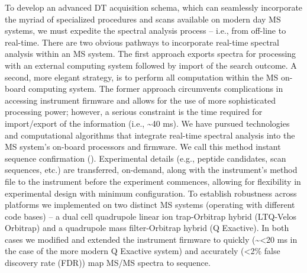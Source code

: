 To develop an advanced DT acquisition schema, which can seamlessly incorporate the myriad of specialized procedures and scans available on modern day MS systems, we must expedite the spectral analysis process -- i.e., from off-line to real-time. There are two obvious pathways to incorporate real-time spectral analysis within an MS system. The first approach exports spectra for processing with an external computing system followed by import of the search outcome.\cite{mqrt} A second, more elegant strategy, is to perform all computation within the MS on-board computing system.\cite{transform} The former approach circumvents complications in accessing instrument firmware and allows for the use of more sophisticated processing power; however, a serious constraint is the time required for import/export of the information (i.e., \textasciitilde40 ms). We have pursued technologies and computational algorithms that integrate real-time spectral analysis into the MS system's on-board processors and firmware. We call this method instant sequence confirmation (\inseq{}). Experimental details (e.g., peptide candidates, scan sequences, etc.) are transferred, on-demand, along with the instrument's method file to the instrument before the experiment commences, allowing for flexibility in experimental design with minimum configuration. To establish robustness across platforms we implemented \inseq{} on two distinct MS systems (operating with different code bases) -- a dual cell quadrupole linear ion trap-Orbitrap hybrid (LTQ-Velos Orbitrap) and a quadrupole mass filter-Orbitrap hybrid (Q Exactive). In both cases we modified and extended the instrument firmware to quickly (\textasciitilde<20 ms in the case of the more modern Q Exactive system) and accurately (<2\% false discovery rate (FDR)) map MS/MS spectra to sequence.
